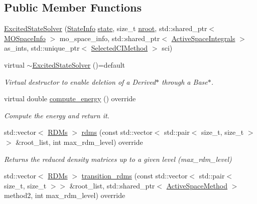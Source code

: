 \subsection*{Public Member Functions}
\begin{DoxyCompactItemize}
\item 
\mbox{\hyperlink{classforte_1_1_excited_state_solver_ad0bd62104f32a74a473498b86f351217}{Excited\+State\+Solver}} (\mbox{\hyperlink{classforte_1_1_state_info}{State\+Info}} \mbox{\hyperlink{classforte_1_1_active_space_method_a609f005cc7d3a1bc03ae517002eb19dc}{state}}, size\+\_\+t \mbox{\hyperlink{classforte_1_1_active_space_method_aa2bafc732bd7023fd32fbd263ef2e903}{nroot}}, std\+::shared\+\_\+ptr$<$ \mbox{\hyperlink{classforte_1_1_m_o_space_info}{M\+O\+Space\+Info}} $>$ mo\+\_\+space\+\_\+info, std\+::shared\+\_\+ptr$<$ \mbox{\hyperlink{classforte_1_1_active_space_integrals}{Active\+Space\+Integrals}} $>$ as\+\_\+ints, std\+::unique\+\_\+ptr$<$ \mbox{\hyperlink{classforte_1_1_selected_c_i_method}{Selected\+C\+I\+Method}} $>$ sci)
\item 
virtual \mbox{\hyperlink{classforte_1_1_excited_state_solver_a188c2390abb69d46932b0f3dec9ded23}{$\sim$\+Excited\+State\+Solver}} ()=default
\begin{DoxyCompactList}\small\item\em Virtual destructor to enable deletion of a Derived$\ast$ through a Base$\ast$. \end{DoxyCompactList}\item 
virtual double \mbox{\hyperlink{classforte_1_1_excited_state_solver_a35b840324fb9e080eda46f29e544c86a}{compute\+\_\+energy}} () override
\begin{DoxyCompactList}\small\item\em Compute the energy and return it. \end{DoxyCompactList}\item 
std\+::vector$<$ \mbox{\hyperlink{classforte_1_1_r_d_ms}{R\+D\+Ms}} $>$ \mbox{\hyperlink{classforte_1_1_excited_state_solver_a67a061a196cc9e492fabc1b6c7995409}{rdms}} (const std\+::vector$<$ std\+::pair$<$ size\+\_\+t, size\+\_\+t $>$$>$ \&root\+\_\+list, int max\+\_\+rdm\+\_\+level) override
\begin{DoxyCompactList}\small\item\em Returns the reduced density matrices up to a given level (max\+\_\+rdm\+\_\+level) \end{DoxyCompactList}\item 
std\+::vector$<$ \mbox{\hyperlink{classforte_1_1_r_d_ms}{R\+D\+Ms}} $>$ \mbox{\hyperlink{classforte_1_1_excited_state_solver_a8fa122b902c65b75470e34cdd475acaf}{transition\+\_\+rdms}} (const std\+::vector$<$ std\+::pair$<$ size\+\_\+t, size\+\_\+t $>$$>$ \&root\+\_\+list, std\+::shared\+\_\+ptr$<$ \mbox{\hyperlink{classforte_1_1_active_space_method}{Active\+Space\+Method}} $>$ method2, int max\+\_\+rdm\+\_\+level) override

\end{DoxyCompactItemize}
